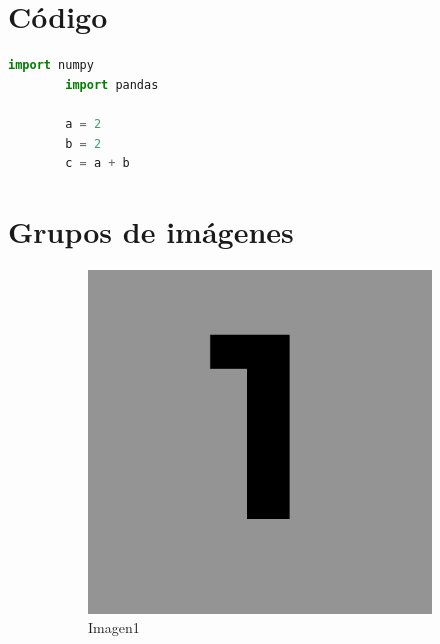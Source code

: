 \section{Código} \label{sec:codigo}

    \begin{lstlisting}[language=Python, caption=Código]
        import numpy
        import pandas
        
        a = 2
        b = 2
        c = a + b
    \end{lstlisting}
    
\section{Grupos de imágenes}

\begin{figure}[H]
    \centering
    \captionsetup[subfigure]{justification=centering}
    \begin{subfigure}{0.4\textwidth}
        \includegraphics[width=\textwidth]{img/img1.png} 
        \caption{Imagen1}
        \label{fig:imagen1}
    \end{subfigure}
    \begin{subfigure}{0.4\textwidth}

\end{subfigure}
\end{figure}
